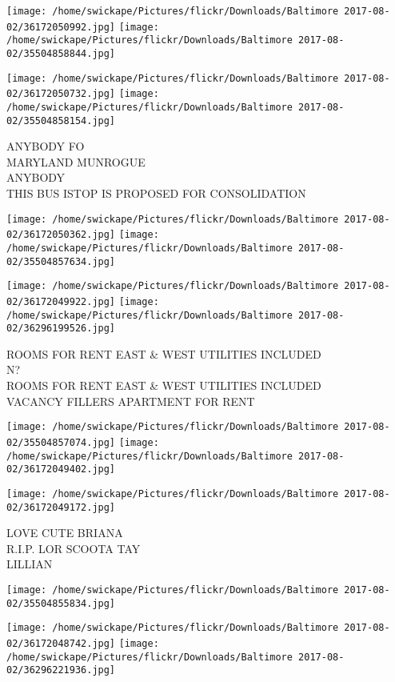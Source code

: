 \documentclass[10pt,letterpaper]{article}
\begin{document}
\texttt{[image: /home/swickape/Pictures/flickr/Downloads/Baltimore 2017-08-02/36172050992.jpg]}
\texttt{[image: /home/swickape/Pictures/flickr/Downloads/Baltimore 2017-08-02/35504858844.jpg]}

\texttt{[image: /home/swickape/Pictures/flickr/Downloads/Baltimore 2017-08-02/36172050732.jpg]}
\texttt{[image: /home/swickape/Pictures/flickr/Downloads/Baltimore 2017-08-02/35504858154.jpg]}

ANYBODY FO\\
MARYLAND MUNROGUE\\
ANYBODY\\
THIS BUS ISTOP IS PROPOSED FOR CONSOLIDATION
\pagebreak

\texttt{[image: /home/swickape/Pictures/flickr/Downloads/Baltimore 2017-08-02/36172050362.jpg]}
\texttt{[image: /home/swickape/Pictures/flickr/Downloads/Baltimore 2017-08-02/35504857634.jpg]}

\texttt{[image: /home/swickape/Pictures/flickr/Downloads/Baltimore 2017-08-02/36172049922.jpg]}
\texttt{[image: /home/swickape/Pictures/flickr/Downloads/Baltimore 2017-08-02/36296199526.jpg]}

ROOMS FOR RENT EAST \& WEST UTILITIES INCLUDED\\
N?\\
ROOMS FOR RENT EAST \& WEST UTILITIES INCLUDED\\
VACANCY FILLERS APARTMENT FOR RENT
\pagebreak

\texttt{[image: /home/swickape/Pictures/flickr/Downloads/Baltimore 2017-08-02/35504857074.jpg]}
\texttt{[image: /home/swickape/Pictures/flickr/Downloads/Baltimore 2017-08-02/36172049402.jpg]}

\vspace{0.25in}
\texttt{[image: /home/swickape/Pictures/flickr/Downloads/Baltimore 2017-08-02/36172049172.jpg]}

LOVE CUTE BRIANA\\
R.I.P. LOR SCOOTA TAY\\
LILLIAN
\pagebreak

\texttt{[image: /home/swickape/Pictures/flickr/Downloads/Baltimore 2017-08-02/35504855834.jpg]}

\vspace{0.25in}
\texttt{[image: /home/swickape/Pictures/flickr/Downloads/Baltimore 2017-08-02/36172048742.jpg]}
\texttt{[image: /home/swickape/Pictures/flickr/Downloads/Baltimore 2017-08-02/36296221936.jpg]}
\end{document}
